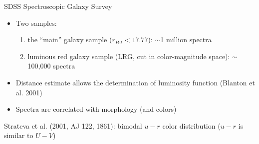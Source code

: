 \documentclass[letterpaper,landscape]{slides}
\begin{document}



\begin{slide}
\begin{center}
{\large \color{red} SDSS Spectroscopic Galaxy Survey }
\end{center}

\begin{itemize}
\item
{\color{blue} Two samples:} 
\begin{enumerate} 
\item the ``main'' galaxy sample ($r_{Pet}<17.77$): $\sim$1 million spectra
\item luminous red galaxy sample (LRG, cut in color-magnitude space): $\sim$100,000 spectra
\end{enumerate}  
\item
Distance estimate allows the determination of luminosity function (Blanton
et al. 2001)
\item Spectra are correlated with morphology (and colors)
\end{itemize}  

\vfill
\end{slide}


\begin{slide}
\begin{center}
\end{center}
Strateva et al. (2001, AJ 122, 1861): {\color{red} bimodal $u-r$ color distribution} ($u-r$ is similar to $U-V$)
\vfill
\end{slide}
\end{document}
